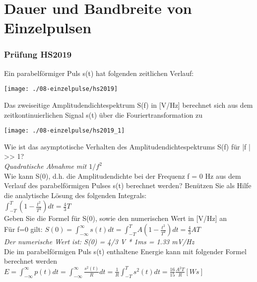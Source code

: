 

\section{Dauer und Bandbreite von Einzelpulsen}

\subsubsection{Prüfung HS2019}
Ein parabelförmiger Puls s(t) hat folgenden zeitlichen Verlauf:
\begin{center}
    \vspace{-8pt}
    \texttt{[image: ./08-einzelpulse/hs2019]}
    \vspace{-8pt}
\end{center}

Das zweiseitige Amplitudendichtespektrum S(f) in [V/Hz] berechnet sich aus dem zeitkontinuierlichen Signal s(t) über die Fouriertransformation zu
\begin{center}
    \vspace{-8pt}
    \texttt{[image: ./08-einzelpulse/hs2019\_1]}
    \vspace{-8pt}
\end{center}

Wie ist das asymptotische Verhalten des Amplitudendichtespektrums S(f) für |f | >> 1?\\
\textit{Quadratische Abnahme mit $1/f^2$}\\

Wie kann S(0), d.h. die Amplitudendichte bei der Frequenz f = 0 Hz aus dem Verlauf des parabelförmigen Pulses s(t) berechnet werden? Benützen Sie als Hilfe die analytische
Lösung des folgenden Integrals:\\
$\int_{-T}^{T} (1-\frac{t^2}{T^2})dt=\frac{4}{3}T$\\

Geben Sie die Formel für S(0), sowie den numerischen Wert in [V/Hz] an\\
Für f=0 gilt: $S(0)=\int_{-\infty}^{\infty}s(t)dt=\int_{-T}^{T}A(1-\frac{t^2}{T^2})dt=\frac{4}{3}AT$\\
\textit{Der numerische Wert ist: S(0) = 4/3 V * 1ms = 1.33 mV/Hz}\\

Die im parabelförmigen Puls s(t) enthaltene Energie kann mit folgender Formel berechnet werden\\
$E=\int_{-\infty}^{\infty}p(t)dt=\int_{-\infty}^{\infty}\frac{s^2(t)}{R}dt=\frac{1}{R}\int_{-T}^{T}s^2(t)dt=\frac{16}{15}\frac{A^2T}{R} [Ws]$\\

